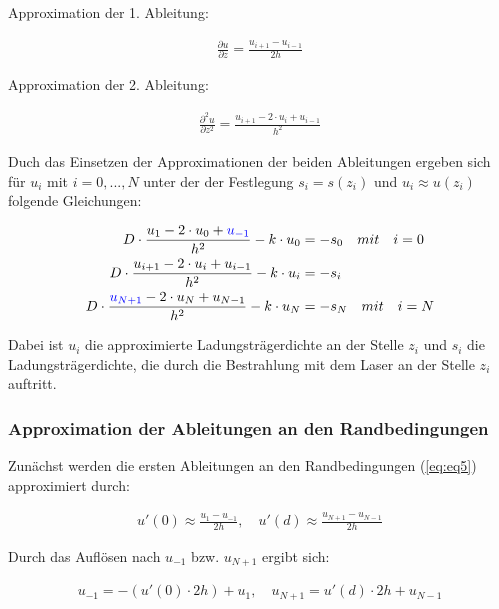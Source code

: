 \documentclass[
	pagesize,
	fontsize=12pt,
	paper=a4,
	oneside,
   reqno
]{scrartcl}
\begin{document}
Approximation der 1. Ableitung:

\begin{align*}
   \frac{\partial u}{\partial z} = \frac{u_{i+1}-u_{i-1}}{2h}
\end{align*}

Approximation der 2. Ableitung:

\begin{align*}
   \frac{\partial^2 u}{\partial z^2} = \frac{u_{i+1}-2\cdot u_i+u_{i-1}}{h^2}
\end{align*}

Duch das Einsetzen der Approximationen der beiden Ableitungen ergeben sich für $u_i$ mit $i=0, ... ,N$ unter der der Festlegung $s_i = s(z_i)$ und $u_i \approx u(z_i)$ folgende Gleichungen:

\begin{align*}
   D\cdot \frac{u_1-2\cdot u_0+\textcolor{blue}{u_{-1}}}{h^2} - k\cdot u_0 &= -s_0 \quad mit \quad i = 0 \\
   D\cdot \frac{u_{i+1}-2\cdot u_i+u_{i-1}}{h^2} - k\cdot u_i &= -s_i \\
   D\cdot \frac{\textcolor{blue}{u_{N+1}}-2\cdot u_N+u_{N-1}}{h^2} - k\cdot u_N &= -s_N \quad mit \quad i = N \\
\end{align*}

Dabei ist $u_i$ die approximierte Ladungsträgerdichte an der Stelle $z_i$ und $s_i$ die Ladungsträgerdichte, die durch die Bestrahlung mit dem Laser an der Stelle $z_i$ auftritt. \\

\subsubsection{Approximation der Ableitungen an den Randbedingungen}

Zunächst werden die ersten Ableitungen an den Randbedingungen (\autoref{eq:eq5}) approximiert durch:

\begin{align*}
   u'(0) \approx \frac{u_1-u_{-1}}{2h}, \quad u'(d) \approx \frac{u_{N+1}-u_{N-1}}{2h}
\end{align*}

Durch das Auflösen nach $u_{-1}$ bzw. $u_{N+1}$ ergibt sich:

\begin{align*}
   u_{-1} = -(u'(0)\cdot 2h) + u_1, \quad u_{N+1} = u'(d)\cdot 2h + u_{N-1}
\end{align*}
\end{document}
